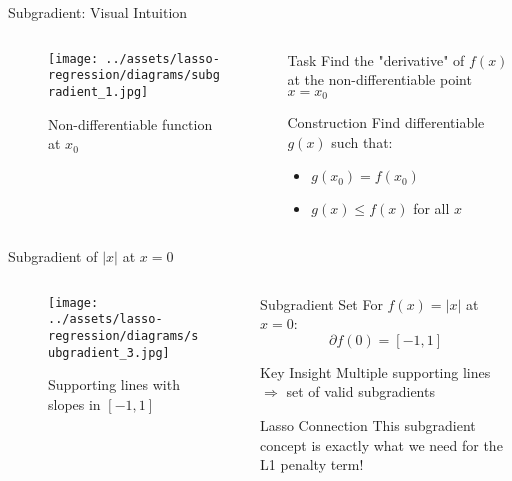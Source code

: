 \documentclass{beamer}
\begin{document}
\begin{frame}{Subgradient: Visual Intuition}
\begin{columns}
\begin{column}{0.6\textwidth}
\begin{figure}
\centering
\texttt{[image: ../assets/lasso-regression/diagrams/subgradient\_1.jpg]}
\caption{{\footnotesize Non-differentiable function at $x_0$}}
\label{fig:Non-differentiable function}
\end{figure}
\end{column}
\begin{column}{0.4\textwidth}
\begin{alertbox}{Task}
Find the "derivative" of $f(x)$ at the non-differentiable point $x = x_0$
\end{alertbox}

\begin{codebox}{Construction}
Find differentiable $g(x)$ such that:
\begin{itemize}
\item $g(x_0) = f(x_0)$
\item $g(x) \leq f(x)$ for all $x$
\end{itemize}
\end{codebox}
\end{column}
\end{columns}
\end{frame}

\begin{frame}{Subgradient of $|x|$ at $x = 0$}
\begin{columns}
\begin{column}{0.5\textwidth}
\begin{figure}
\centering
\texttt{[image: ../assets/lasso-regression/diagrams/subgradient\_3.jpg]}
\caption{{\footnotesize Supporting lines with slopes in $[-1,1]$}}
\end{figure}
\end{column}
\begin{column}{0.5\textwidth}
\begin{codebox}{Subgradient Set}
For $f(x) = |x|$ at $x = 0$:
$$\partial f(0) = [-1, 1]$$
\end{codebox}

\begin{keypointsbox}{Key Insight}
Multiple supporting lines $\Rightarrow$ set of valid subgradients
\end{keypointsbox}

\begin{alertbox}{Lasso Connection}
This subgradient concept is exactly what we need for the L1 penalty term!
\end{alertbox}
\end{column}
\end{columns}
\end{frame}
\end{document}

